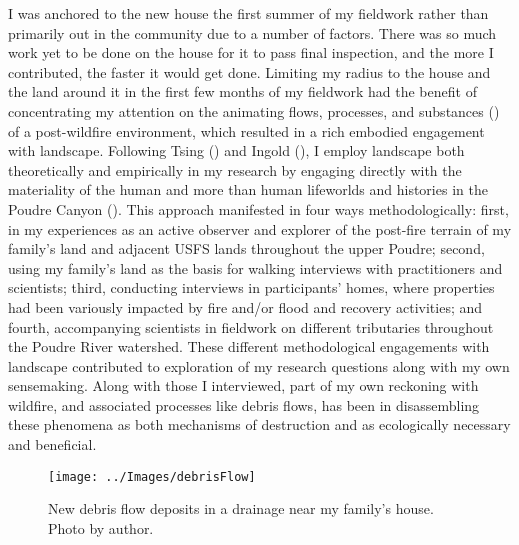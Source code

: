 \documentclass[
]{article}
\begin{document}
I was anchored to the new house the first summer of my fieldwork rather than primarily out in the community due to a number of factors. There was so much work yet to be done on the house for it to pass final inspection, and the more I contributed, the faster it would get done. Limiting my radius to the house and the land around it in the first few months of my fieldwork had the benefit of concentrating my attention on the animating flows, processes, and substances () of a post-wildfire environment, which resulted in a rich embodied engagement with landscape. Following Tsing () and Ingold (), I employ landscape both theoretically and empirically in my research by engaging directly with the materiality of the human and more than human lifeworlds and histories in the Poudre Canyon (). This approach manifested in four ways methodologically: first, in my experiences as an active observer and explorer of the post-fire terrain of my family's land and adjacent USFS lands throughout the upper Poudre; second, using my family's land as the basis for walking interviews with practitioners and scientists; third, conducting interviews in participants' homes, where properties had been variously impacted by fire and/or flood and recovery activities; and fourth, accompanying scientists in fieldwork on different tributaries throughout the Poudre River watershed. These different methodological engagements with landscape contributed to exploration of my research questions along with my own sensemaking. Along with those I interviewed, part of my own reckoning with wildfire, and associated processes like debris flows, has been in disassembling these phenomena as both mechanisms of destruction and as ecologically necessary and beneficial.

\begin{figure}
\texttt{[image: ../Images/debrisFlow]} \caption[New debris flow deposits]{New debris flow deposits in a drainage near my family's house. Photo by author.}\label{fig:figureTitle-19}
\end{figure}
\end{document}

